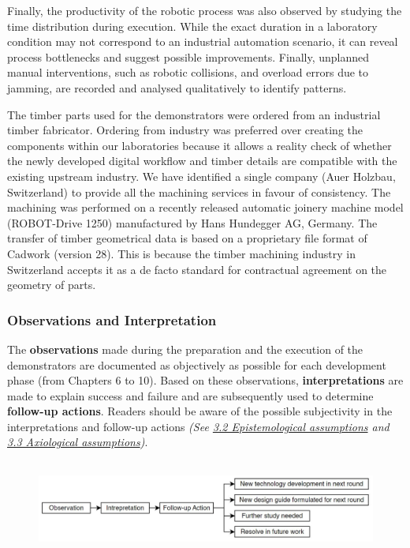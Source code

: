 \documentclass[11pt]{book}
\begin{document}
Finally, the productivity of the robotic process was also observed by studying the time distribution during execution. While the exact duration in a laboratory condition may not correspond to an industrial automation scenario, it can reveal process bottlenecks and suggest possible improvements. Finally, unplanned manual interventions, such as robotic collisions, and overload errors due to jamming, are recorded and analysed qualitatively to identify patterns.

The timber parts used for the demonstrators were ordered from an industrial timber fabricator. Ordering from industry was preferred over creating the components within our laboratories because it allows a reality check of whether the newly developed digital workflow and timber details are compatible with the existing upstream industry. We have identified a single company (Auer Holzbau, Switzerland) to provide all the machining services in favour of consistency. The machining was performed on a recently released automatic joinery machine model (ROBOT-Drive 1250) manufactured by Hans Hundegger AG, Germany. The transfer of timber geometrical data is based on a proprietary file format of Cadwork (version 28). This is because the timber machining industry in Switzerland accepts it as a de facto standard for contractual agreement on the geometry of parts.

\subsubsection{Observations and Interpretation}

The \textbf{observations }made during the preparation and the execution of the demonstrators are documented as objectively as possible for each development phase (from Chapters 6 to 10). Based on these observations, \textbf{interpretations }are made to explain success and failure and are subsequently used to determine \textbf{follow-up actions}. Readers should be aware of the possible subjectivity in the interpretations and follow-up actions \textit{(See \uline{3.2 Epistemological assumptions} and \uline{3.3 Axiological assumptions})}. 

\begin{figure}[H]
\includegraphics[width=15.92cm,height=3.17cm]{./images/image10.jpg}
\end{figure}
\end{document}
